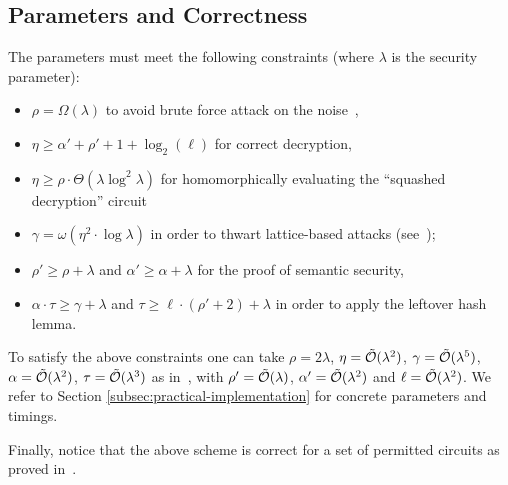 \documentclass[11pt]{llncs}
\renewcommand\geq\geqslant
\newcommand{\Ot}[1]{{\cal \tilde O}(#1)}
\newcommand\ignore[1]{}
\begin{document}
\subsection{Parameters and Correctness}

\label{s:constraints}

 The parameters must meet the following constraints (where $\lambda$ is the security parameter):
\begin{itemize}
\renewcommand{\labelitemi}{\tiny $\bullet$}
\itemsep.4em
\item $\rho = \Omega(\lambda)$ to avoid brute force attack on the noise~\cite{CN2012,CNT2012},

\item $\eta \geq \alpha'+\rho'+1+\log_2(\ell)$ for correct decryption,

\item  $\eta\geq \rho \cdot \Theta(\lambda\log^2\lambda)$ for
  homomorphically evaluating the ``squashed decryption'' circuit

\item $\gamma = \omega(\eta^2\cdot \log\lambda)$ in order to thwart
  lattice-based attacks (see~\cite{vDGHV2010,CMNT2011});

\item $\rho' \geq \rho + \lambda$ and  $\alpha' \geq \alpha+\lambda$  for
  the proof of semantic security,

\item $\alpha\cdot \tau\geq \gamma+\lambda$ and $\tau \geq \ell \cdot
  (\rho'+2) + \lambda$ in order to apply the
  leftover hash lemma.
\end{itemize}

To satisfy the above constraints one can take $\rho=2\lambda$,
$\eta=\Ot{\lambda^2}$, $\gamma=\Ot{\lambda^5}$,
$\alpha=\Ot{\lambda^2}$, $\tau=\Ot{\lambda^3}$ as in~\cite{CNT2012},
with $\rho'=\Ot{\lambda}$, $\alpha'=\Ot{\lambda^2}$ and $\ell=\Ot{\lambda^2}$.\ignore{ 
The main difference with the original DGHV scheme is that the
ciphertext expansion ratio becomes $\gamma/\ell=\Ot{\lambda^3}$
instead of $\gamma=\Ot{\lambda^5}$. However the public key size (using
the compressed public key technique from~\cite{CNT2012}) becomes 
$\Ot{\lambda^7}$ instead of $\Ot{\lambda^5}$.}
We refer to Section 
\ref{subsec:practical-implementation} for concrete parameters and
timings.

Finally, notice that the above scheme is correct for a set of permitted circuits as proved in~\cite[Appendix~A]{CLT2013a}.

\end{document}
